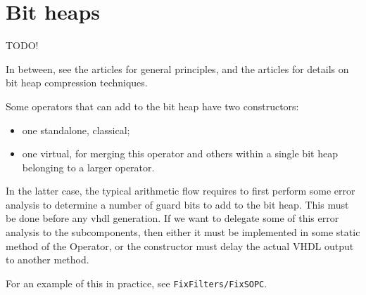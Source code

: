 \documentclass{article}
\begin{document}
\section{Bit heaps}
TODO!

In between, see the articles \cite{DinIstSer2013-FPL-BitHeap} for general principles, and the articles \cite{kz14a,kz14b} for details on bit heap compression techniques.

Some operators that can add to the bit heap have two constructors:
\begin{itemize}
\item one standalone, classical;
  
\item one virtual, for merging this operator and others within a single bit heap belonging to a larger operator.

\end{itemize}

In the latter case, the typical arithmetic flow requires to first perform some error analysis to determine a number of guard bits to add to the bit heap.
This must be done before any vhdl generation.
If we want to delegate some of this error analysis to the subcomponents, then either it must be implemented in some static method of the Operator, or the constructor must delay the actual VHDL output to another method.

For an example of this in practice, see \texttt{FixFilters/FixSOPC}.




\end{document}

